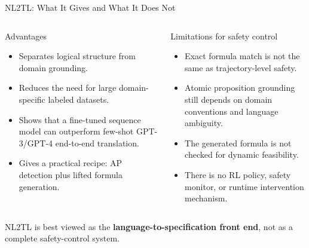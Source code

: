 \documentclass[aspectratio=169]{beamer}
\begin{document}
\begin{frame}{NL2TL: What It Gives and What It Does Not}
\begin{columns}[T]
\begin{block}{Advantages}
\small
\begin{itemize}
  \item Separates logical structure from domain grounding.
  \item Reduces the need for large domain-specific labeled datasets.
  \item Shows that a fine-tuned sequence model can outperform few-shot GPT-3/GPT-4 end-to-end translation.
  \item Gives a practical recipe: AP detection plus lifted formula generation.
\end{itemize}
\end{block}

\begin{block}{Limitations for safety control}
\small
\begin{itemize}
  \item Exact formula match is not the same as trajectory-level safety.
  \item Atomic proposition grounding still depends on domain conventions and language ambiguity.
  \item The generated formula is not checked for dynamic feasibility.
  \item There is no RL policy, safety monitor, or runtime intervention mechanism.
\end{itemize}
\end{block}
\end{columns}

\vspace{0.35em}
\begin{center}
\small
NL2TL is best viewed as the \textbf{language-to-specification front end}, not as a complete safety-control system.
\end{center}
\end{frame}
\end{document}
